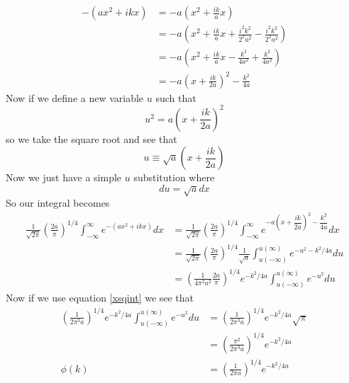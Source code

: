 \documentclass[11pt]{article}
\numberwithin{equation}{section}
\begin{document}
\begin{enumerate}[(a)]
\begin{align*}
-(ax^2+ikx) &= -a\left(x^2+\frac{ik}{a}x\right)\\
&= -a\left(x^2+\frac{ik}{a}x + \frac{i^2k^2}{2^2a^2} - \frac{i^2k^2}{2^2a^2}\right)\\
&= -a\left(x^2+\frac{ik}{a}x - \frac{k^2}{4a^2} + \frac{k^2}{4a^2}\right)\\
&= -a\left(x+\frac{ik}{2a}\right)^2 - \frac{k^2}{4a}
\end{align*}
Now if we define a new variable $u$ such that
$$u^2 = a\left(x+\frac{ik}{2a}\right)^2$$
so we take the square root and see that 
$$u\equiv \sqrt{a}\left(x+\frac{ik}{2a}\right)$$
Now we just have a simple $u$ substitution where
$$du = \sqrt{a}dx$$
So our integral becomes
\begin{align*}
\frac{1}{\sqrt{2\pi}}\left(\frac{2a}{\pi}\right)^{1/4}\int_{-\infty}^{\infty}e^{-(ax^2+ikx)}dx &= \frac{1}{\sqrt{2\pi}}\left(\frac{2a}{\pi}\right)^{1/4}\int_{-\infty}^{\infty}e^{-a\left(x+\dfrac{ik}{2a}\right)^2 - \dfrac{k^2}{4a}}dx\\
&= \frac{1}{\sqrt{2\pi}}\left(\frac{2a}{\pi}\right)^{1/4}\frac{1}{\sqrt{a}}\int_{u(-\infty)}^{u(\infty)}e^{-u^2 - {k^2}/{4a}}du\\
&= \left(\frac{1}{4\pi^2a^2}\frac{2a}{\pi}\right)^{1/4}e^{-{k^2}/{4a}}\int_{u(-\infty)}^{u(\infty)}e^{-u^2} du
\end{align*}
Now if we use equation \ref{xsqint} we see that
\begin{align*}
\left(\frac{1}{2\pi^3a}\right)^{1/4}e^{-{k^2}/{4a}}\int_{u(-\infty)}^{u(\infty)}e^{-u^2} du &= \left(\frac{1}{2\pi^3a}\right)^{1/4}e^{-{k^2}/{4a}}\sqrt{\pi}\\
&= \left(\frac{\pi^2}{2\pi^3a}\right)^{1/4}e^{-{k^2}/{4a}}\\
\phi(k) &= \left(\frac{1}{2\pi a}\right)^{1/4}e^{-{k^2}/{4a}}\\
\end{align*}


\end{enumerate}
\end{document}

